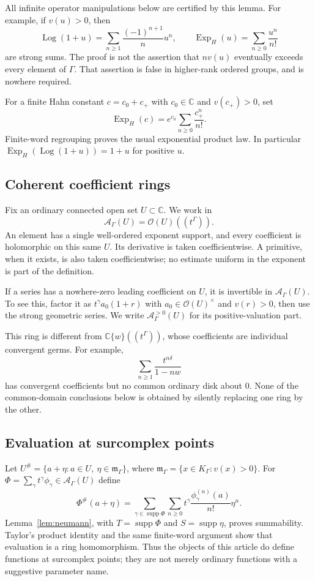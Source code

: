 \documentclass[11pt,a4paper]{article}
\numberwithin{equation}{section}
\theoremstyle{definition}
\theoremstyle{remark}
\newcommand{\C}{\mathbb C}
\newcommand{\K}{K_\Gamma}
\newcommand{\A}{\mathscr A_\Gamma}
\newcommand{\m}{\mathfrak m_\Gamma}
\newcommand{\supp}{\operatorname{supp}}
\newcommand{\Hol}{\mathcal O}
\newcommand{\Log}{\operatorname{Log}}
\newcommand{\ExpH}{\operatorname{Exp}_{\!H}}
\begin{document}
All infinite operator manipulations below are certified by this lemma.
For example, if $v(u)>0$, then
\begin{equation}\label{eq:logexp}
 \Log(1+u)=\sum_{n\ge1}\frac{(-1)^{n+1}}n u^n,
 \qquad
 \ExpH(u)=\sum_{n\ge0}\frac{u^n}{n!}
\end{equation}
are strong sums.  The proof is not the assertion that $n v(u)$ eventually
exceeds every element of $\Gamma$.  That assertion is false in higher-rank
ordered groups, and is nowhere required.

For a finite Hahn constant $c=c_0+c_+$ with $c_0\in\C$ and $v(c_+)>0$, set
\begin{equation}\label{eq:finiteexp}
 \ExpH(c)=e^{c_0}\sum_{n\ge0}\frac{c_+^n}{n!}.
\end{equation}
Finite-word regrouping proves the usual exponential product law.  In
particular $\ExpH(\Log(1+u))=1+u$ for positive $u$.

\subsection{Coherent coefficient rings}

Fix an ordinary connected open set $U\subset\C$.  We work in
\[
 \A(U)=\Hol(U)((t^\Gamma)).
\]
An element has a single well-ordered exponent support, and every coefficient
is holomorphic on this same $U$.  Its derivative is taken coefficientwise.
A primitive, when it exists, is also taken coefficientwise; no estimate
uniform in the exponent is part of the definition.

If a series has a nowhere-zero leading coefficient on $U$, it is invertible
in $\A(U)$.  To see this, factor it as $t^\gamma a_0(1+r)$ with
$a_0\in\Hol(U)^\times$ and $v(r)>0$, then use the strong geometric series.
We write $\A^{>0}(U)$ for its positive-valuation part.

This ring is different from $\C\{w\}((t^\Gamma))$, whose coefficients are
individual convergent germs.  For example,
\[
 \sum_{n\ge1}\frac{t^{n\delta}}{1-nw}
\]
has convergent coefficients but no common ordinary disk about $0$.
None of the common-domain conclusions below is obtained by silently replacing
one ring by the other.

\subsection{Evaluation at surcomplex points}
\label{sec:evaluation}

Let $U^\#=\{a+\eta:a\in U,\ \eta\in\m\}$, where
$\m=\{x\in\K:v(x)>0\}$.  For
$\Phi=\sum_\gamma t^\gamma\phi_\gamma\in\A(U)$ define
\begin{equation}\label{eq:evaluation}
 \Phi^\#(a+\eta)
   =\sum_{\gamma\in\supp\Phi}\sum_{n\ge0}t^\gamma
       \frac{\phi_\gamma^{(n)}(a)}{n!}\eta^n.
\end{equation}
Lemma~\ref{lem:neumann}, with $T=\supp\Phi$ and
$S=\supp\eta$, proves summability.  Taylor's product identity and the same
finite-word argument show that evaluation is a ring homomorphism.
Thus the objects of this article do define functions at surcomplex points;
they are not merely ordinary functions with a suggestive parameter name.
\end{document}
